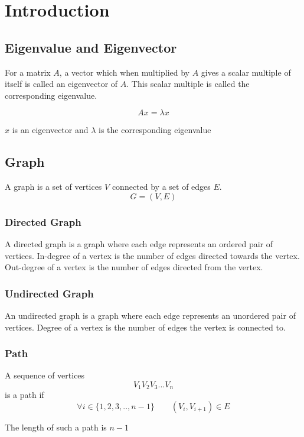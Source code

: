 \documentclass[12pt, a4paper]{article}
\begin{document}
    \section{Introduction}

      \subsection{Eigenvalue and Eigenvector}
      \begin{flushleft}
      For a matrix $A$, a vector which when multiplied by $A$ gives a scalar multiple of itself is called an eigenvector of $A$. This scalar multiple is called the corresponding eigenvalue.

      $$Ax = \lambda x$$

      $x$ is an eigenvector and $\lambda$ is the corresponding eigenvalue

      \end{flushleft}
      \subsection{Graph}
      A graph is a set of vertices $V$ connected by a set of edges $E$.  
      $$G = (V, E)$$
        \subsubsection{Directed Graph}
        A directed graph is a graph where each edge represents an ordered pair of vertices. In-degree of a vertex is the number of edges directed towards the vertex. Out-degree of a vertex is the number of edges directed from the vertex.
        \subsubsection{Undirected Graph}
        An undirected graph is a graph where each edge represents an unordered pair of vertices. Degree of a vertex is the number of edges the vertex is connected to.

        \subsubsection{Path}
        \begin{flushleft}
        A sequence of vertices $$V_1V_2V_3...V_n$$ is a path if 
        $$\forall i \in \{1,2,3,..,n-1\} \qquad (V_{i}, V_{i+1}) \in E$$

        The length of such a path is $n-1$
        \end{flushleft}
\end{document}
